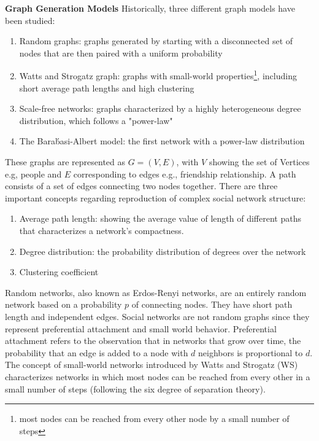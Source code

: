 \documentclass[11pt,a4paper]{article}
\begin{document}
\textbf{Graph Generation Models} Historically, three different graph models have been studied: 
\begin{enumerate}
\item Random graphs: graphs generated by starting with a disconnected set of nodes that are then paired with a uniform probability
\item Watts and Strogatz graph: graphs with small-world properties\footnote{most nodes can be reached from every other node by a small number of steps}, including short average path lengths and high clustering
\item Scale-free networks: graphs characterized by a highly heterogeneous degree distribution, which follows a "power-law"
\item The Barab́asi-Albert model: the first network with a power-law distribution
\end{enumerate}
These graphs are represented as $G = (V, E)$, with $V$ showing the set of Vertices e.g, people and $E$ corresponding to edges e.g., friendship relationship. A path consists of a set of edges connecting two nodes together. There are three important concepts regarding reproduction of complex social network structure: 

\begin{enumerate}
\item Average path length: showing the average value of length of different paths that characterizes a network's compactness.
\item Degree distribution: the probability distribution of degrees over the network
\item Clustering coefficient %
\end{enumerate}

Random networks, also known as Erdos-Renyi networks, are an entirely random network based on a probability $p$ of connecting nodes. They have short path length and independent edges. %
Social networks are not random graphs since they represent preferential attachment and small world behavior. Preferential attachment refers to the observation that in networks that grow over time, the probability that an edge is added to a node with $d$ neighbors is proportional to $d$.  The concept of small-world networks introduced by Watts and Strogatz (WS) characterizes networks in which most nodes can be reached from every other in a small number of steps (following the six degree of separation theory). 
\end{document}
